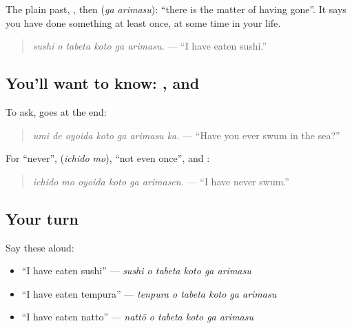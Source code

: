 The plain past, \textbf{}, then \textbf{ } (\emph{ga arimasu}): \textquotedblleft{}there is the matter of having gone\textquotedblright{}. It says you have done something at least once, at some time in your life.

\begin{quote}
\textbf{   }
\end{quote}

\begin{quote}
\emph{sushi o tabeta koto ga arimasu.} — \textquotedblleft{}I have eaten sushi.\textquotedblright{}
\end{quote}

\subsection*{You'll want to know: , and }
To ask, \textbf{} goes at the end:

\begin{quote}
\textbf{   }
\end{quote}

\begin{quote}
\emph{umi de oyoida koto ga arimasu ka.} — \textquotedblleft{}Have you ever swum in the sea?\textquotedblright{}
\end{quote}

For \textquotedblleft{}never\textquotedblright{}, \textbf{} (\emph{ichido mo}), \textquotedblleft{}not even once\textquotedblright{}, and \textbf{}:

\begin{quote}
\textbf{   }
\end{quote}

\begin{quote}
\emph{ichido mo oyoida koto ga arimasen.} — \textquotedblleft{}I have never swum.\textquotedblright{}
\end{quote}

\subsection*{Your turn}
Say these aloud:

\begin{itemize}
\raggedright
  \item \textquotedblleft{}I have eaten sushi\textquotedblright{} — \emph{sushi o tabeta koto ga arimasu}
  \item \textquotedblleft{}I have eaten tempura\textquotedblright{} — \emph{tenpura o tabeta koto ga arimasu}
  \item \textquotedblleft{}I have eaten natto\textquotedblright{} — \emph{nattō o tabeta koto ga arimasu}
\end{itemize}

